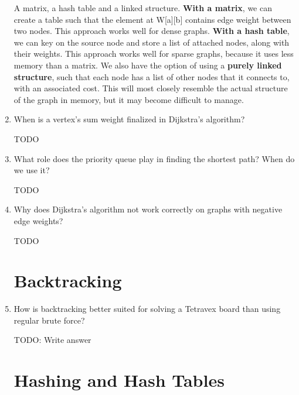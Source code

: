 \documentclass[11pt]{article}
\newenvironment{answer}{\large\lstset{basicstyle=\large}\color{white}}{}
\newenvironment{answer}{\large\lstset{basicstyle=\large}\color{red}}{}
\begin{document}
\begin{enumerate}
    \begin{answer}
    A matrix, a hash table and a linked structure.
    {\bf With a matrix}, we can create a table such that the element at W[a][b]
    contains edge weight between two nodes. This approach works well for dense
    graphs.
    {\bf With a hash table}, we can key on the source node and store a list of
    attached nodes, along with their weights. This approach works well for
    sparse graphs, because it uses less memory than a matrix.
    We also have the option of using a {\bf purely linked structure}, such that
    each node has a list of other nodes that it connects to, with an associated
    cost. This will most closely resemble the actual structure of the graph in
    memory, but it may become difficult to manage.
    \end{answer}

\item When is a vertex's sum weight  finalized in Dijkstra's algorithm?

    \begin{answer}
    \Huge TODO
    \end{answer}

\item What role does the priority queue play in finding the shortest path?
      When do we use it?

    \begin{answer}
    \Huge TODO
    \end{answer}

\item Why does Dijkstra's algorithm not work correctly on graphs with negative
      edge weights?

    \begin{answer}
    \Huge TODO
    \end{answer}

\section*{Backtracking}

\item How is backtracking better suited for solving a Tetravex board than
      using regular brute force?

    \begin{answer}
    \Huge TODO: Write answer
    \end{answer}

\section*{Hashing and Hash Tables}


\end{enumerate}
\end{document}
